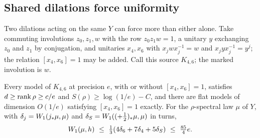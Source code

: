 \subsection{Shared dilations force uniformity}\label{sec:rates-shared}

Two dilations acting on the same $Y$ can force more than either alone. Take commuting involutions $z_0,z_1,w$ with the row
$z_0z_1w=1$, a unitary $y$ exchanging $z_0$ and $z_1$ by conjugation, and unitaries $x_4,x_6$ with $x_jwx_j^{-1}=w$ and
$x_jyx_j^{-1}=y^j$; the relation $[x_4,x_6]=1$ may be added. Call this source $K_{4,6}$; the marked involution is $w$.

\begin{theorem}\label{thm:shared}
Every model of $K_{4,6}$ at precision $e$, with or without $[x_4,x_6]=1$, satisfies $d\ge\operatorname{rank}\rho\ge c/e$ and
$S(\rho)\ge\log(1/e)-C$, and there are flat models of dimension $O(1/e)$ satisfying $[x_4,x_6]=1$ exactly. For the
$\rho$-spectral law $\mu$ of $Y$, with $\delta_j=W_1(j_*\mu,\mu)$ and $\delta_S=W_1((+\frac12)_*\mu,\mu)$ in turns,
\[
\Wone(\mu,h)\ \le\ \tfrac13(4\delta_6+7\delta_4+5\delta_S)\ \le\ \tfrac{85}4e .
\]
\end{theorem}

